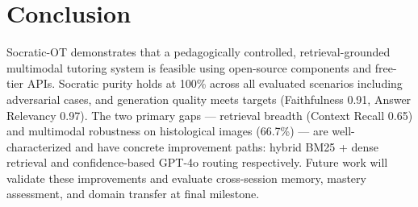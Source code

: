 \documentclass[11pt]{article}
\begin{document}
\section{Conclusion}

Socratic-OT demonstrates that a pedagogically controlled, retrieval-grounded
multimodal tutoring system is feasible using open-source components and
free-tier APIs.
Socratic purity holds at 100\% across all evaluated scenarios including
adversarial cases, and generation quality meets targets (Faithfulness 0.91,
Answer Relevancy 0.97).
The two primary gaps --- retrieval breadth (Context Recall 0.65) and
multimodal robustness on histological images (66.7\%) --- are
well-characterized and have concrete improvement paths: hybrid BM25 + dense
retrieval and confidence-based GPT-4o routing respectively.
Future work will validate these improvements and evaluate cross-session
memory, mastery assessment, and domain transfer at final milestone.


\end{document}
